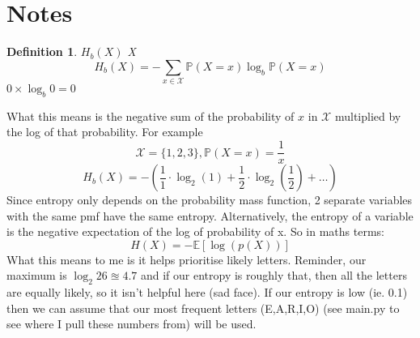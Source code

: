 \documentclass{article}
\newtheorem{definition}{Definition}
\begin{document}
\newpage
\section{Notes}
\begin{definition}
      $H_b (X)$  X 
\[H_b (X) = -\sum_{x\in\mathcal{X}} \mathbb{P}(X=x) \log_b \mathbb{P}(X=x)\]
 $0\times \log_b{0}=0$ 
\end{definition}
{What this means is the negative sum of the probability of $x$ in $\mathcal{X}$ multiplied by the log of that probability. For example \[\mathcal{X}=\{1,2,3\}, \mathbb{P}(X=x)=\frac{1}{x}\]\[H_b (X) = - (\frac{1}{1}\cdot\log_2 (1) + \frac{1}{2}\cdot\log_2 (\frac{1}{2}) + \ldots)\]}
{Since entropy only depends on the probability mass function, 2 separate variables with the same pmf have the same entropy. Alternatively, the entropy of a variable is the negative expectation of the log of probability of x. So in maths terms: }
\[H(X)=-\mathbb{E}\left[\log(p(X))\right]\]
{What this means to me is it helps prioritise likely letters. Reminder, our maximum is $\log_2 26\approxeq 4.7$ and if our entropy is roughly that, then all the letters are equally likely, so it isn't helpful here (sad face). If our entropy is low (ie. 0.1) then we can assume that our most frequent letters (E,A,R,I,O) (see main.py to see where I pull these numbers from) will be used.}
\end{document}
